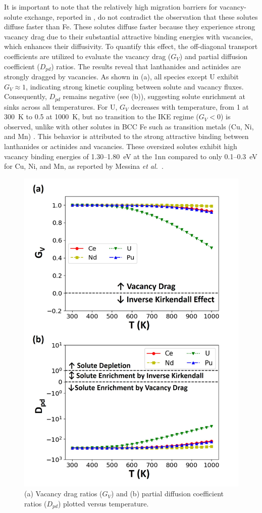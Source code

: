\documentclass[preprint,12pt]{elsarticle}
\begin{document}
It is important to note that the relatively high migration barriers for vacancy-solute exchange, reported in , do not contradict the observation that these solutes diffuse faster than Fe. These solutes diffuse faster because they experience strong vacancy drag due to their substantial attractive binding energies with vacancies, which enhances their diffusivity. To quantify this effect, the off-diagonal transport coefficients are utilized to evaluate the vacancy drag ($G_V$) and partial diffusion coefficient ($D_{pd}$) ratios. The results reveal that lanthanides and actinides are strongly dragged by vacancies. As shown in (a), all species except U exhibit \( G_V \approx 1 \), indicating strong kinetic coupling between solute and vacancy fluxes. Consequently, \( D_{pd} \) remains negative (see (b)), suggesting solute enrichment at sinks across all temperatures. For U, \( G_V \) decreases with temperature, from 1 at 300~K to 0.5 at 1000~K, but no transition to the IKE regime (\( G_V < 0 \)) is observed, unlike with other solutes in BCC Fe such as transition metals (Cu, Ni, and Mn)  \cite{messina_exact_2014, messina_solute_2020}.
This behavior is attributed to the strong attractive binding between lanthanides or actinides and vacancies. These oversized solutes exhibit high vacancy binding energies of 1.30–1.80~eV at the 1nn compared to only 0.1–0.3~eV for Cu, Ni, and Mn, as reported by Messina \textit{et al.}~\cite{messina_exact_2014}.


\FloatBarrier

\begin{figure}[!ht]
    \centering
    \includegraphics[width=0.625\linewidth]{drag_ratios_pdc_fe.jpg}
    \caption{(a) Vacancy drag ratios ($G_V$) and (b) partial diffusion coefficient ratios ($D_{pd}$) plotted versus temperature.}
    \label{fig:vacancy_drag}
\end{figure}
\end{document}

